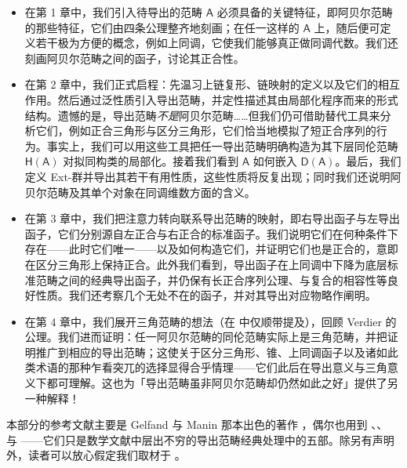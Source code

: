 \begin{itemize}[leftmargin=0.5cm]
	\item 在第 1 章中，我们引入待导出的范畴 $\mathsf{A}$ 必须具备的关键特征，即阿贝尔范畴的那些特征，它们由四条公理整齐地刻画；在任一这样的 $\mathsf{A}$ 上，随后便可定义若干极为方便的概念，例如上同调，它使我们能够真正做同调代数。我们还刻画阿贝尔范畴之间的函子，讨论其正合性。

	\item 在第 2 章中，我们正式启程：先温习上链复形、链映射的定义以及它们的相互作用。然后通过泛性质引入导出范畴，并定性描述其由局部化程序而来的形式结构。遗憾的是，导出范畴\textit{不是}阿贝尔范畴……但我们仍可借助替代工具来分析它们，例如正合三角形与区分三角形，它们恰当地模拟了短正合序列的行为。事实上，我们可以用这些工具把任一导出范畴明确构造为其下层同伦范畴 $\mathsf{H(A)}$ 对拟同构类的局部化。接着我们看到 $\mathsf{A}$ 如何嵌入 $\mathsf{D(A)}$。最后，我们定义 Ext-群并导出其若干有用性质，这些性质将反复出现；同时我们还说明阿贝尔范畴及其单个对象在同调维数方面的含义。

	\item 在第 3 章中，我们把注意力转向联系导出范畴的映射，即右导出函子与左导出函子，它们分别源自左正合与右正合的标准函子。我们说明它们在何种条件下存在——此时它们唯一——以及如何构造它们，并证明它们也是正合的，意即在区分三角形上保持正合。此外我们看到，导出函子在上同调中下降为底层标准范畴之间的经典导出函子，并仍保有长正合序列公理、与复合的相容性等良好性质。我们还考察几个无处不在的函子，并对其导出对应物略作阐明。

	\item 在第 4 章中，我们展开三角范畴的想法（在 \cite[第 3.1 节]{[Imp21]} 中仅顺带提及），回顾 Verdier 的公理。我们进而证明：任一阿贝尔范畴的同伦范畴实际上是三角范畴，并把证明推广到相应的导出范畴；这使关于区分三角形、锥、上同调函子以及诸如此类术语的那种乍看突兀的选择显得合乎情理——它们此后在导出意义与三角意义下都可理解。这也为「导出范畴虽非阿贝尔范畴却仍然如此之好」提供了另一种解释！
\end{itemize}

本部分的参考文献主要是 Gelfand 与 Manin 那本出色的著作 \cite{[GM03]}，偶尔也用到 \cite{[HS97]}、\cite{[KS06]}、\cite{[Mac78]} 与 \cite{[Wei94]}——它们只是数学文献中层出不穷的导出范畴经典处理中的五部。除另有声明外，读者可以放心假定我们取材于 \cite{[GM03]}。



\newpage
\pagestyle{fancy}
